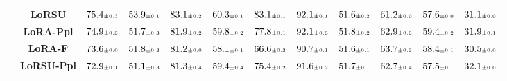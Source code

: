 \begin{table}
\begin{center}
\begin{small}
\begin{tabular}{l c c c c c c c c c c c}
& \textbf{LoRSU} & $75.4 \mtiny{\pm 0.3}$ & $53.9 \mtiny{\pm 0.1}$ & $83.1 \mtiny{\pm 0.2}$ & $60.3 \mtiny{\pm 0.1}$ & $83.1 \mtiny{\pm 0.1}$ & $92.1 \mtiny{\pm 0.1}$ & $51.6 \mtiny{\pm 0.2}$ & $61.2 \mtiny{\pm 0.0}$ & $57.6 \mtiny{\pm 0.0}$ & $31.1 \mtiny{\pm 0.0}$ \\
& \textbf{LoRA-Ppl} & $74.9 \mtiny{\pm 0.3}$ & $51.7 \mtiny{\pm 0.3}$ & $81.9 \mtiny{\pm 0.2}$ & $59.8 \mtiny{\pm 0.2}$ & $77.8 \mtiny{\pm 0.1}$ & $92.1 \mtiny{\pm 0.3}$ & $51.8 \mtiny{\pm 0.2}$ & $62.9 \mtiny{\pm 0.3}$ & $59.4 \mtiny{\pm 0.2}$ & $31.9 \mtiny{\pm 0.1}$ \\
& \textbf{LoRA-F} & $73.6 \mtiny{\pm 0.0}$ & $51.8 \mtiny{\pm 0.3}$ & $81.2 \mtiny{\pm 0.0}$ & $58.1 \mtiny{\pm 0.1}$ & $66.6 \mtiny{\pm 0.3}$ & $90.7 \mtiny{\pm 0.1}$ & $51.6 \mtiny{\pm 0.1}$ & $63.7 \mtiny{\pm 0.3}$ & $58.4 \mtiny{\pm 0.1}$ & $30.5 \mtiny{\pm 0.0}$ \\
& \textbf{LoRSU-Ppl} & $72.9 \mtiny{\pm 0.1}$ & $51.1 \mtiny{\pm 0.3}$ & $81.3 \mtiny{\pm 0.4}$ & $59.4 \mtiny{\pm 0.4}$ & $75.4 \mtiny{\pm 0.2}$ & $91.6 \mtiny{\pm 0.2}$ & $51.7 \mtiny{\pm 0.1}$ & $62.7 \mtiny{\pm 0.4}$ & $57.5 \mtiny{\pm 0.1}$ & $32.1 \mtiny{\pm 0.0}$ \\
\bottomrule
\end{tabular}
\endgroup
\end{small}
\end{center}
\vskip -0.1in
\end{table}


